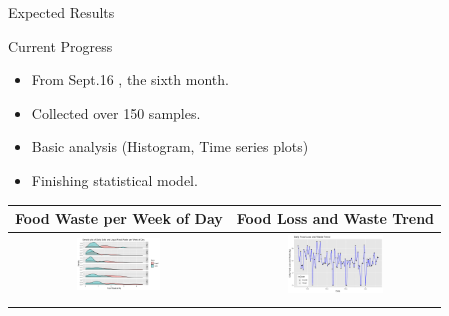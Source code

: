\documentclass{beamer}
\begin{document}
\begin{frame}{Expected Results}
    \begin{block}{Current Progress}
        \begin{itemize}
            \item From Sept.16 , the sixth month.
            \item Collected over 150 samples.
            \item Basic analysis (Histogram, Time series plots)
            \item Finishing statistical model.
        \end{itemize}

        \begin{table}[]
            \begin{tabular}{cc}
                \hline
                    \small Food Waste per Week of Day & Food Loss and Waste Trend \\ \hline
                    \includegraphics[width=2.2cm]{weekFW.png}
                    & 
                    \includegraphics[width=2.5cm]{tsFLW.png}\\
                    &      \\
                \hline
            \end{tabular}
        \end{table}
    \end{block}
\end{frame}
\end{document}
